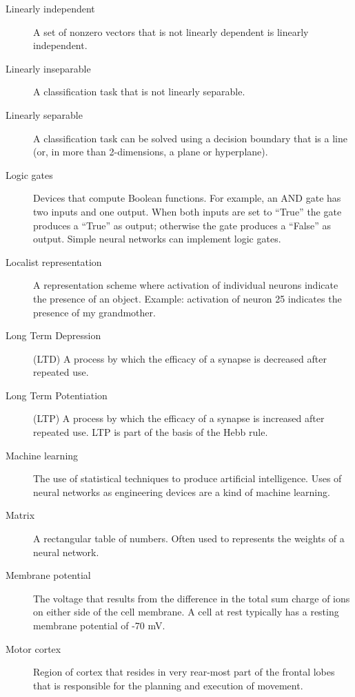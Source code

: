 \begin{description}
\item[Linearly independent] A set of nonzero vectors that is not linearly
dependent is linearly independent.

\item[Linearly inseparable] A classification task that is not linearly separable.

\item[Linearly separable] A classification task can be solved using a decision boundary that is a line (or, in more than 2-dimensions, a plane or hyperplane).

\item[Logic gates] Devices that compute Boolean functions. For example, an AND gate has two inputs and one output. When both inputs are set to ``True'' the gate produces a ``True'' as output; otherwise the gate produces a ``False'' as output. Simple neural networks can implement logic gates.

\item[Localist representation] A representation scheme where activation of individual neurons indicate the presence of an object. Example: activation of neuron 25 indicates the presence of my grandmother.

\item[Long Term Depression] (LTD) A  process by which the efficacy of a synapse is decreased after repeated use.

\item[Long Term Potentiation] (LTP) A process by which the efficacy of a synapse is increased after repeated use. LTP is part of the basis of the Hebb rule.

\item[Machine learning] The use of statistical techniques to produce artificial intelligence. Uses of neural networks as engineering devices are a kind of machine learning.

\item[Matrix] A rectangular table of numbers. Often used to represents the 
weights of a neural network.

\item[Membrane potential] The voltage that results from the difference in the total sum charge of ions on either side of the cell membrane. A cell at rest typically has a resting membrane potential of -70 mV. 


\item[Motor cortex] Region of cortex that resides in very rear-most part of the frontal lobes that is responsible for the planning and execution of movement. 


\end{description}
